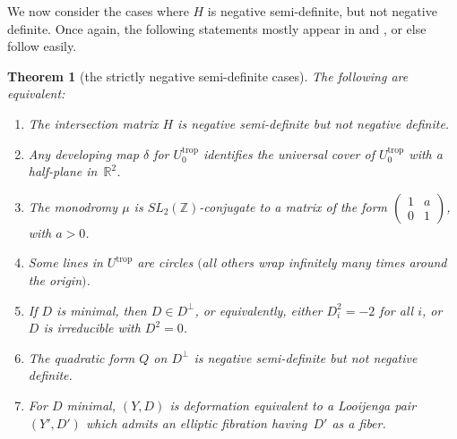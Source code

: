 \documentclass[11pt]{article}
\numberwithin{equation}{section}
\numberwithin{figure}{section}
\numberwithin{table}{section}
\DeclareMathOperator{\trop}{trop}
\let\bb=\mathbb
\newtheorem{thm}{Theorem}[section]
\theoremstyle{definition}
\begin{document}
We now consider the cases where $H$ is negative semi-definite, but not negative definite. Once again, the following statements mostly appear in \cite{GHK1} and \cite{GHK2}, or else follow easily.
\begin{thm}[the strictly negative semi-definite cases]\label{The strictly negative semi-definite case}\label{NegSD}
The following are equivalent:
\begin{enumerate}\itemsep=0pt
\item[$1.$] The {intersection matrix} $H$ is negative semi-definite but not negative definite.
\item[$2.$] Any {developing map} $\delta$ for $U^{\trop}_0$ identifies the universal cover of $U^{\trop}_0$ with a half-plane in~$\bb{R}^2$.
\item[$3.$] The monodromy $\mu$ is $SL_2(\bb{Z})$-conjugate to a matrix of the form
	$\left(\begin{smallmatrix}
		1 &a \\
		0 &1
		\end{smallmatrix}\right)$,
		 with $a > 0$.
\item[$4.$] Some {lines} in $U^{\trop}$ are circles $($all others wrap infinitely many times around the origin$)$.
\item[$5.$] If $D$ is minimal, then $D \in D^{\perp}$, or equivalently, either $D_i^2 = -2$ for all $i$, or~$D$ is irreducible with $D^2=0$.
\item[$6.$] The {quadratic form} $Q$ on $D^{\perp}$ is negative semi-definite but not negative definite.
\item[$7.$] For $D$ minimal, $(Y,D)$ is deformation equivalent to a Looijenga pair $(Y',D')$ which admits an elliptic fibration having~$D'$ as a fiber.
\end{enumerate}
\end{thm}
\end{document}
